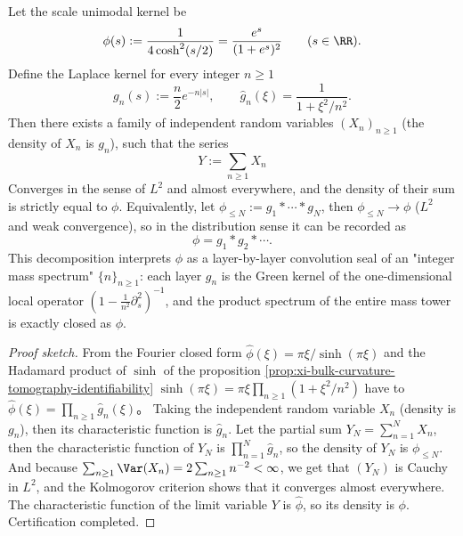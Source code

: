 \begin{conclusion}\label{con:xi-terminal-scale-kernel-mass-tower-laplace}
Let the scale unimodal kernel be
\[
\phi(s):=\frac{1}{4\cosh^{2}(s/2)}=\frac{e^{s}}{(1+e^{s})^{2}}\qquad(s\in\RR).
\]
Define the Laplace kernel for every integer \(n\ge 1\)
\[
g_n(s):=\frac{n}{2}e^{-n|s|},
\qquad
\widehat g_n(\xi)=\frac{1}{1+\xi^{2}/n^{2}}.
\]
Then there exists a family of independent random variables \((X_n)_{n\ge 1}\) (the density of \(X_n\) is \(g_n\)), such that the series
\[
Y:=\sum_{n\ge 1}X_n
\]
Converges in the sense of \(L^{2}\) and almost everywhere, and the density of their sum is strictly equal to \(\phi\).
Equivalently, let \(\phi_{\le N}:=g_1*\cdots*g_N\), then \(\phi_{\le N}\to\phi\) (\(L^2\) and weak convergence), so in the distribution sense it can be recorded as
\[
\phi=g_1*g_2*\cdots .
\]
This decomposition interprets \(\phi\) as a layer-by-layer convolution seal of an "integer mass spectrum" \(\{n\}_{n\ge 1}\): each layer \(g_n\) is the Green kernel of the one-dimensional local operator \((1-\frac{1}{n^{2}}\partial_s^{2})^{-1}\), and the product spectrum of the entire mass tower is exactly closed as \(\phi\).
\end{conclusion}
\begin{proof}[Proof sketch]
From the Fourier closed form \(\widehat\phi(\xi)=\pi\xi/\sinh(\pi\xi)\) and the Hadamard product of \(\sinh\) of the proposition \ref{prop:xi-bulk-curvature-tomography-identifiability}
\(
\sinh(\pi\xi)=\pi\xi\prod_{n\ge 1}(1+\xi^{2}/n^{2})
\)
have to
\(
\widehat\phi(\xi)=\prod_{n\ge 1}\widehat g_n(\xi)
\)。
Taking the independent random variable \(X_n\) (density is \(g_n\)), then its characteristic function is \(\widehat g_n\).
Let the partial sum \(Y_N=\sum_{n=1}^{N}X_n\), then the characteristic function of \(Y_N\) is \(\prod_{n=1}^{N}\widehat g_n\), so the density of \(Y_N\) is \(\phi_{\le N}\).
And because \(\sum_{n\ge 1}\Var(X_n)=2\sum_{n\ge 1}n^{-2}<\infty\), we get that \((Y_N)\) is Cauchy in \(L^2\), and the Kolmogorov criterion shows that it converges almost everywhere.
The characteristic function of the limit variable \(Y\) is \(\widehat\phi\), so its density is \(\phi\). Certification completed.
\end{proof}

